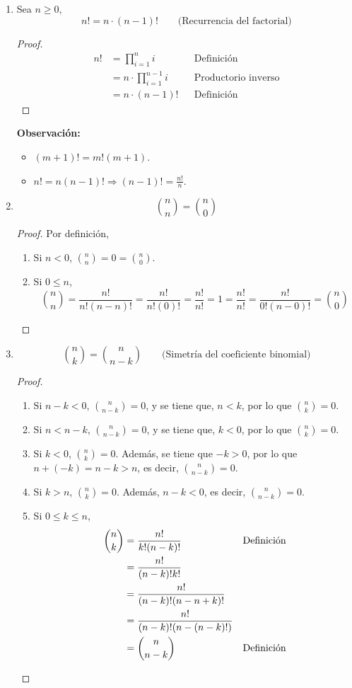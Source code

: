 \begin{enumerate}[label=\alph*)]
  \item Sea $n\geq 0$, \[n! = n\cdot (n-1)! \qquad \text{(Recurrencia del factorial)}\]
  \begin{proof}\leavevmode
    \begin{align*}
      n! &= \prod_{i=1}^{n} i && \text{Definición}\\
      &= n\cdot \prod_{i=1}^{n-1} i && \text{Productorio inverso}\\
      &= n\cdot (n-1)! && \text{Definición}
    \end{align*}
  \end{proof}
  \textbf{Observación:}
  \begin{itemize}
    \item $(m+1)! = m!(m+1)$.
    \item $n! = n(n-1)! \Rightarrow (n-1)! = \frac{n!}{n}$.
  \end{itemize}
  
  \item \[\binom{n}{n} = \binom{n}{0}\]
  \begin{proof}\leavevmode Por definición,
    \begin{enumerate}[label=\roman*)]
      \item Si $n<0$, $\binom{n}{n} = 0 = \binom{n}{0}$.
      \item Si $0\leq n$, \[\binom{n}{n} = \frac{n!}{n!(n-n)!} = \frac{n!}{n!(0)!} = \frac{n!}{n!} = 1 = \frac{n!}{n!} =\frac{n!}{0!(n-0)!} = \binom{n}{0}\]
    \end{enumerate}
  \end{proof}
  
  \item \[\binom{n}{k} = \binom{n}{n-k} \qquad \text{(Simetría del coeficiente binomial)}\]
  \begin{proof}\leavevmode
    \begin{enumerate}[label=\roman*)]
      \item Si $n-k<0$, $\binom{n}{n-k}=0$, y se tiene que, $n<k$, por lo que $\binom{n}{k}=0$.
      \item Si $n<n-k$, $\binom{n}{n-k}=0$, y se tiene que, $k<0$, por lo que $\binom{n}{k}=0$.
      \item Si $k<0$, $\binom{n}{k} = 0$. Además, se tiene que $-k>0$, por lo que $n+(-k)=n-k>n$, es decir, $\binom{n}{n-k} = 0$.
      \item Si $k>n$, $\binom{n}{k} = 0$. Además, $n-k<0$, es decir, $\binom{n}{n-k} = 0$.
      \item Si $0\leq k \leq n$,
      \begin{align*}
        \binom{n}{k} &= \frac{n!}{k!(n-k)!} && \text{Definición}\\
        &= \frac{n!}{(n-k)!k!}\\
        &= \frac{n!}{(n-k)!(n-n+k)!}\\
        &= \frac{n!}{(n-k)!(n-(n-k)!)}\\
        &= \binom{n}{n-k} && \text{Definición} \qedhere
      \end{align*}
    \end{enumerate}
  \end{proof}
  

\end{enumerate}
